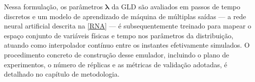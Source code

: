 Nessa formulação, os parâmetros $\boldsymbol{\lambda}$ da GLD são avaliados em passos de tempo discretos e um modelo de aprendizado de máquina de múltiplas saídas --- a rede neural artificial descrita na \autoref{RNA} --- é subsequentemente treinado para mapear o espaço conjunto de variáveis físicas e tempo nos parâmetros da distribuição, atuando como interpolador contínuo entre os instantes efetivamente simulados. O procedimento concreto de construção desse emulador, incluindo o plano de experimentos, o número de réplicas e as métricas de validação adotadas, é detalhado no capítulo de metodologia.
